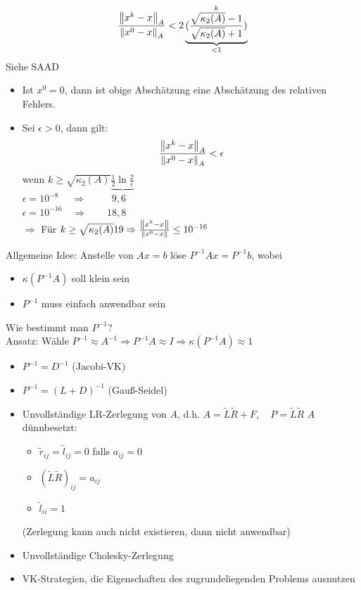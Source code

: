 \begin{align*}
  \frac{\left\lVert x^k - x \right\rVert_A}{\left\lVert x^0 - x \right\rVert_A} < 2 \underbrace{(\frac{\sqrt{\kappa_2(A)} - 1}{\sqrt{\kappa_2(A)}+1} )}_{<1}^k
\end{align*}
\beweis Siehe SAAD
\begin{itemize}
  \item Ist $x^0 = 0$, dann ist obige Abschätzung eine Abschätzung des relativen Fehlers.
  \item Sei $\epsilon > 0$, dann gilt:
  \begin{align*}
    \frac{\left\lVert x^k - x \right\rVert_A}{\left\lVert x^0 - x \right\rVert_A} < \epsilon
  \end{align*}
  wenn $k \geq \sqrt{\kappa_2(A)} \underbrace{\frac{1}{2} \ln \frac{2}{\epsilon}}$\\
  $\epsilon = 10^{-8} \;\quad\Rightarrow\qquad \;\;9,6$\\
  $\epsilon = 10^{-16} \quad\Rightarrow\qquad 18,8$\\
  $\Rightarrow$ Für $k \geq \sqrt{\kappa_2(A)}19 \Rightarrow \frac{\left\lVert x^k - x \right\rVert}{\left\lVert x^0 - x \right\rVert} \leq 10^{-16}$
\end{itemize}
Allgemeine Idee: Anstelle von $Ax = b$ löse $P^{-1}Ax = P^{-1}b$, wobei
\begin{itemize}
  \item $\kappa(P^{-1}A)$ soll klein sein
  \item $P^{-1}$ muss einfach anwendbar sein
\end{itemize}
Wie bestimmt man $P^{-1}$?\\
Ansatz: Wähle $P^{-1}\approx A^{-1} \Rightarrow P^{-1}A \approx I \Rightarrow \kappa(P^{-1}A) \approx 1$
\begin{itemize}
  \item $P^{-1} = D^{-1}$ (Jacobi-VK)
  \item $P^{-1} = (L + D)^{-1}$ (Gauß-Seidel)
  \item Unvollständige LR-Zerlegung von $A$, d.h. $A = \tilde{L}\tilde{R} + F, \quad P = \tilde{L}\tilde{R}$ $A$ dünnbesetzt:
    \begin{itemize}
      \item $\tilde{r}_{ij} = \tilde{l}_{ij} = 0$ falls $a_{ij} = 0$
      \item $(\tilde{L}\tilde{R})_{ij} = a_{ij}$
      \item $\tilde{l}_{ii} = 1$
    \end{itemize}
    (Zerlegung kann auch nicht existieren, dann nicht anwendbar)\\
  \item Unvollständige Cholesky-Zerlegung 
  \item VK-Strategien, die Eigenschaften des zugrundeliegenden Problems ausnutzen
\end{itemize}

